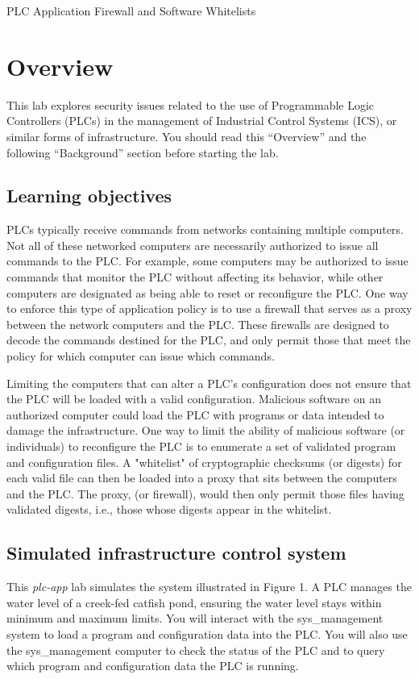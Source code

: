 


\begin{center}
{\LARGE PLC Application Firewall and Software Whitelists}
\vspace{0.1in}\\
\end{center}


\section{Overview}
This lab explores security issues related to the use of Programmable Logic Controllers (PLCs) 
in the management of Industrial Control Systems (ICS), or similar forms of infrastructure.
You should read this ``Overview'' and the following ``Background'' section before starting the lab. 

\subsection{Learning objectives}
PLCs typically receive commands from networks containing multiple computers.  Not all of 
these networked computers are necessarily authorized to issue all commands to the PLC.
For example, some computers may be authorized to issue commands that monitor the PLC without
affecting its behavior, while other computers are designated as being able to reset or reconfigure
the PLC.  One way to enforce this type of application policy is to use a firewall that serves as
a proxy between the network computers and the PLC.  These firewalls are designed to decode the commands
destined for the PLC, and only permit those that meet the policy for which computer can issue which commands.

Limiting the computers that can alter a PLC's configuration does not ensure that the PLC will be loaded
with a valid configuration.  Malicious software on an authorized computer could load the PLC with programs
or data intended to damage the infrastructure.  One way to limit the ability of malicious software (or
individuals) to reconfigure the PLC is to enumerate a set of validated program and configuration files.
A "whitelist" of cryptographic checksums (or digests) for each valid file can then be loaded into a 
proxy that sits between the computers and the PLC.  The proxy, (or firewall), would then only permit those
files having validated digests, i.e., those whose digests appear in the whitelist.

\subsection{Simulated infrastructure control system}
This \textit{plc-app} lab simulates the system illustrated in Figure 1.  A PLC manages the water level of a creek-fed 
catfish pond, ensuring the water level stays within minimum and maximum limits.
You will interact with the sys\_management system to load a program and configuration data into the 
PLC.  You will also use the sys\_management computer to check the status of the PLC and to query which program 
and configuration data the PLC is running. 


